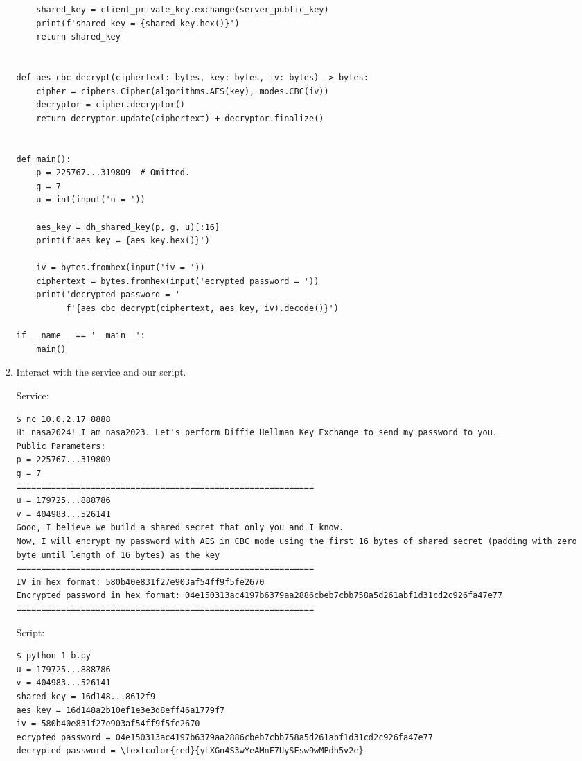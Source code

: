 \documentclass[12pt, a4paper]{article}
\begin{document}
\begin{enumerate}[label=(\alph*)]
\begin{enumerate}[label=(\arabic*)]
\begin{verbatim}
    shared_key = client_private_key.exchange(server_public_key)
    print(f'shared_key = {shared_key.hex()}')
    return shared_key


def aes_cbc_decrypt(ciphertext: bytes, key: bytes, iv: bytes) -> bytes:
    cipher = ciphers.Cipher(algorithms.AES(key), modes.CBC(iv))
    decryptor = cipher.decryptor()
    return decryptor.update(ciphertext) + decryptor.finalize()


def main():
    p = 225767...319809  # Omitted.
    g = 7
    u = int(input('u = '))

    aes_key = dh_shared_key(p, g, u)[:16]
    print(f'aes_key = {aes_key.hex()}')

    iv = bytes.fromhex(input('iv = '))
    ciphertext = bytes.fromhex(input('ecrypted password = '))
    print('decrypted password = '
          f'{aes_cbc_decrypt(ciphertext, aes_key, iv).decode()}')

if __name__ == '__main__':
    main()
      \end{verbatim}

      \pagebreak
      \item Interact with the service and our script.

      Service:
      \begin{Verbatim}[frame=single, fontsize=\scriptsize, breaklines]
$ nc 10.0.2.17 8888
Hi nasa2024! I am nasa2023. Let's perform Diffie Hellman Key Exchange to send my password to you.
Public Parameters:
p = 225767...319809
g = 7
============================================================
u = 179725...888786
v = 404983...526141
Good, I believe we build a shared secret that only you and I know.
Now, I will encrypt my password with AES in CBC mode using the first 16 bytes of shared secret (padding with zero byte until length of 16 bytes) as the key
============================================================
IV in hex format: 580b40e831f27e903af54ff9f5fe2670
Encrypted password in hex format: 04e150313ac4197b6379aa2886cbeb7cbb758a5d261abf1d31cd2c926fa47e77
============================================================
      \end{Verbatim}

      Script:
      \begin{Verbatim}[frame=single, fontsize=\scriptsize, commandchars=\\\{\}]
$ python 1-b.py
u = 179725...888786
v = 404983...526141
shared_key = 16d148...8612f9
aes_key = 16d148a2b10ef1e3e3d8eff46a1779f7
iv = 580b40e831f27e903af54ff9f5fe2670
ecrypted password = 04e150313ac4197b6379aa2886cbeb7cbb758a5d261abf1d31cd2c926fa47e77
decrypted password = \textcolor{red}{yLXGn4S3wYeAMnF7UySEsw9wMPdh5v2e}
      \end{Verbatim}


\end{enumerate}
\end{enumerate}
\end{document}
